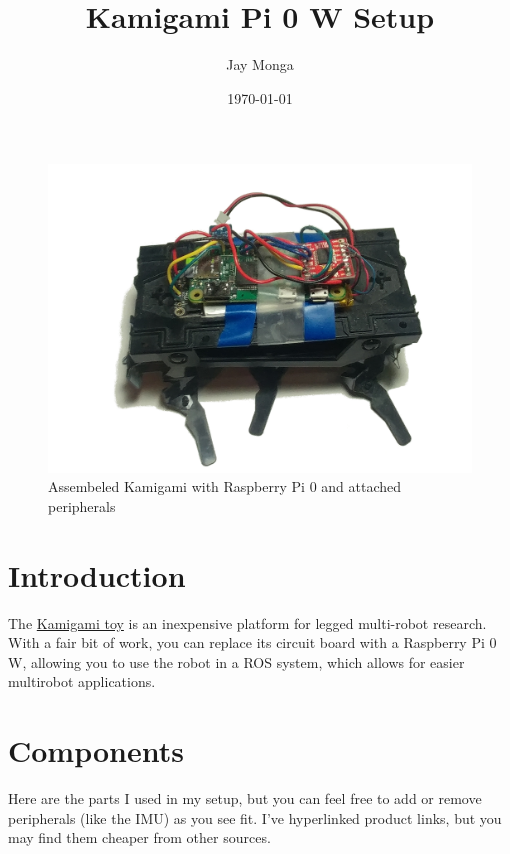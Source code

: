 \documentclass[11pt]{article}
\title{Kamigami Pi 0 W Setup}
\author{Jay Monga}
\date{\today}
\begin{document}
\maketitle

\begin{figure}[h]
    \centering
    \includegraphics[width=\textwidth]{images/advert_edit.png}
    \caption{Assembeled Kamigami with Raspberry Pi 0 and attached peripherals}
    \label{fig:kamigami}
\end{figure}

\newpage

\tableofcontents
\newpage

\section{Introduction}
The \href{https://kamigamirobots.com/}{Kamigami toy} is an inexpensive platform for legged multi-robot research. With a fair bit of work, you can replace its circuit board with a Raspberry Pi 0 W, allowing you to use the robot in a ROS system, which allows for easier multirobot applications.

\section{Components} \label{sec:components}

Here are the parts I used in my setup, but you can feel free to add or remove peripherals (like the IMU) as you see fit. I've hyperlinked product links, but you may find them cheaper from other sources.
\end{document}
